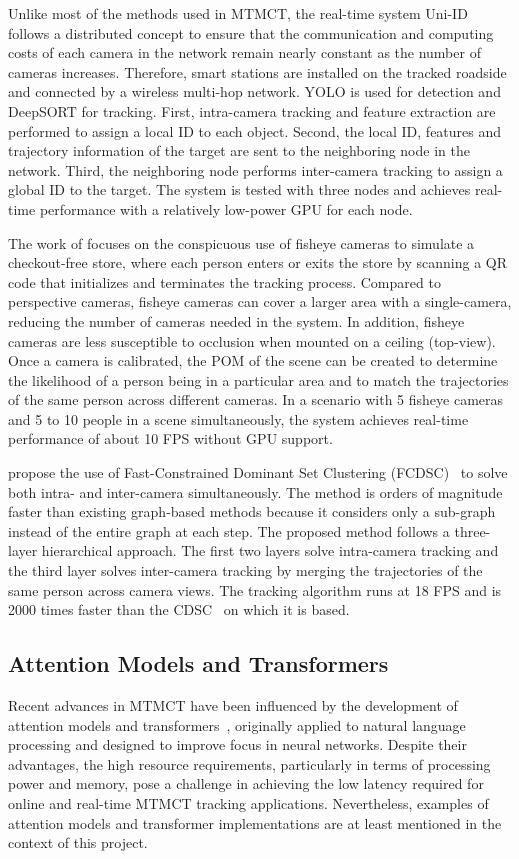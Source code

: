 Unlike most of the methods used in MTMCT, the real-time system Uni-ID~\cite{Chen22} follows a distributed concept to ensure that the communication and computing costs of each camera in the network remain nearly constant as the number of cameras increases. Therefore, smart stations are installed on the tracked roadside and connected by a wireless multi-hop network. YOLO is used for detection and DeepSORT for tracking. First, intra-camera tracking and feature extraction are performed to assign a local ID to each object. Second, the local ID, features and trajectory information of the target are sent to the neighboring node in the network. Third, the neighboring node performs inter-camera tracking to assign a global ID to the target. The system is tested with three nodes and achieves real-time performance with a relatively low-power GPU for each node.

The work of \textcite{Wang21} focuses on the conspicuous use of fisheye cameras to simulate a checkout-free store, where each person enters or exits the store by scanning a QR code that initializes and terminates the tracking process. Compared to perspective cameras, fisheye cameras can cover a larger area with a single-camera, reducing the number of cameras needed in the system. In addition, fisheye cameras are less susceptible to occlusion when mounted on a ceiling (top-view). Once a camera is calibrated, the POM of the scene can be created to determine the likelihood of a person being in a particular area and to match the trajectories of the same person across different cameras. In a scenario with 5 fisheye cameras and 5 to 10 people in a scene simultaneously, the system achieves real-time performance of about 10 FPS without GPU support.

\citeauthor{Tesfaye19} propose the use of Fast-Constrained Dominant Set Clustering (FCDSC)~\cite{Tesfaye19} to solve both intra- and inter-camera simultaneously. The method is orders of magnitude faster than existing graph-based methods because it  considers only a sub-graph instead of the entire graph at each step. The proposed method follows a three-layer hierarchical approach. The first two layers solve intra-camera tracking and the third layer solves inter-camera tracking by merging the trajectories of the same person across camera views. The tracking algorithm runs at 18 FPS and is 2000 times faster than the CDSC~\cite{Zemene16} on which it is based.

\subsection{Attention Models and Transformers}\label{subsec:attention_models_and_transformers}
Recent advances in MTMCT have been influenced by the development of attention models and transformers~\cite{Vaswani17}, originally applied to natural language processing and designed to improve focus in neural networks. Despite their advantages, the high resource requirements, particularly in terms of processing power and memory, pose a challenge in achieving the low latency required for online and real-time MTMCT tracking applications. Nevertheless, examples of attention models and transformer implementations are at least mentioned in the context of this project.

